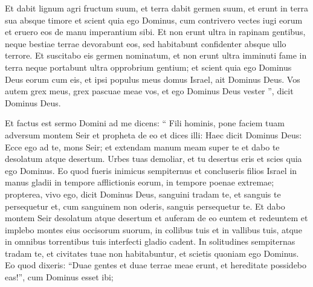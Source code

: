 \begin{biblechapter}
\begin{biblechapter}
\begin{biblechapter}
\begin{biblechapter}
\begin{biblechapter}
\begin{biblechapter}
\begin{biblechapter}
\begin{biblechapter}
\begin{biblechapter}
\begin{biblechapter}
\begin{biblechapter}
\begin{biblechapter}
\begin{biblechapter}
\begin{biblechapter}
\begin{biblechapter}
\begin{biblechapter}
\begin{biblechapter}
\begin{biblechapter}
\begin{biblechapter}
\begin{biblechapter}
\begin{biblechapter}
\begin{biblechapter}
\begin{biblechapter}
\begin{biblechapter}
\begin{biblechapter}
\begin{biblechapter}
\begin{biblechapter}
\begin{biblechapter}
\begin{biblechapter}
\begin{biblechapter}
\begin{biblechapter}
\begin{biblechapter}
\begin{biblechapter}
\begin{biblechapter}
 \verse Et dabit lignum agri fructum suum, et terra dabit germen suum, et erunt in terra sua absque timore et scient quia ego Dominus, cum contrivero vectes iugi eorum et eruero eos de manu imperantium sibi. 
\verse Et non erunt ultra in rapinam gentibus, neque bestiae terrae devorabunt eos, sed habitabunt confidenter absque ullo terrore. 
\verse Et suscitabo eis germen nominatum, et non erunt ultra imminuti fame in terra neque portabunt ultra opprobrium gentium; 
 \verse et scient quia ego Dominus Deus eorum cum eis, et ipsi populus meus domus Israel, ait Dominus Deus. 
\verse Vos autem grex meus, grex pascuae meae vos, et ego Dominus Deus vester ”, dicit Dominus Deus.
 
\begin{biblechapter}
\verse Et factus est sermo Domini ad me dicens: 
\verse “ Fili hominis, pone faciem tuam adversum montem Seir et propheta de eo et dices illi: 
\verse Haec dicit Dominus Deus:
 Ecce ego ad te, mons Seir;
 et extendam manum meam super te
 et dabo te desolatum atque desertum.
 \verse Urbes tuas demoliar,
 et tu desertus eris
 et scies quia ego Dominus.
 \verse Eo quod fueris inimicus sempiternus et concluseris filios Israel in manus gladii in tempore afflictionis eorum, in tempore poenae extremae; 
\verse propterea, vivo ego, dicit Dominus Deus, sanguini tradam te, et sanguis te persequetur et, cum sanguinem non oderis, sanguis persequetur te. 
\verse Et dabo montem Seir desolatum atque desertum et auferam de eo euntem et redeuntem 
\verse et implebo montes eius occisorum suorum, in collibus tuis et in vallibus tuis, atque in omnibus torrentibus tuis interfecti gladio cadent. 
\verse In solitudines sempiternas tradam te, et civitates tuae non habitabuntur, et scietis quoniam ego Dominus.
 \verse Eo quod dixeris: “Duae gentes et duae terrae meae erunt, et hereditate possidebo eas!”, cum Dominus esset ibi; 

\end{biblechapter}
\end{biblechapter}
\end{biblechapter}
\end{biblechapter}
\end{biblechapter}
\end{biblechapter}
\end{biblechapter}
\end{biblechapter}
\end{biblechapter}
\end{biblechapter}
\end{biblechapter}
\end{biblechapter}
\end{biblechapter}
\end{biblechapter}
\end{biblechapter}
\end{biblechapter}
\end{biblechapter}
\end{biblechapter}
\end{biblechapter}
\end{biblechapter}
\end{biblechapter}
\end{biblechapter}
\end{biblechapter}
\end{biblechapter}
\end{biblechapter}
\end{biblechapter}
\end{biblechapter}
\end{biblechapter}
\end{biblechapter}
\end{biblechapter}
\end{biblechapter}
\end{biblechapter}
\end{biblechapter}
\end{biblechapter}
\end{biblechapter}
